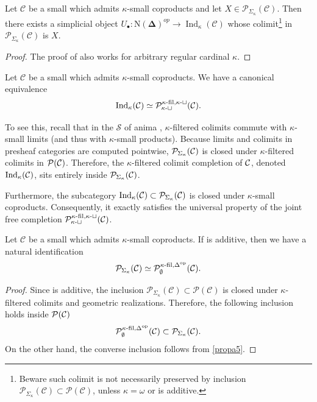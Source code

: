 \documentclass[a4paper,10pt, oneside]{amsart}
\begin{document}
\begin{prop}\label{propa5}
	Let $\mathcal{C}$ be a small \infcat which admits $\kappa$-small coproducts and let $X \in \mathcal{P}_{\Sigma_\kappa}(\mathcal{C})$. Then there exists a simplicial object $U_{\bullet}: \mathrm{N}(\boldsymbol{\Delta})^{o p} \rightarrow \operatorname{Ind}_\kappa(\mathcal{C})$ whose colimit\footnote{Beware such colimit is not necessarily preserved by inclusion $\mathcal{P}_{\Sigma_\kappa}(\mathcal{C}) \subset \mathcal{P}(\mathcal{C})$, unless $\kappa=\omega$ or \mcc is additive.} in $\mathcal{P}_{\Sigma_\kappa}(\mathcal{C})$ is $X$.
	
\end{prop}
\begin{proof}
	The proof of \cite[Lemma 5.5.8.14]{htt} also works for arbitrary regular cardinal $\kappa$.
\end{proof}
\begin{rem}
	Let $\mathcal{C}$ be a small \infcat which admits $\kappa$-small coproducts. We have a canonical equivalence $$\mathrm{Ind}_\kappa(\mathcal{C}) \simeq \mathcal{P}_{\kappa\text{-}\sqcup}^{\kappa\text{-}\mathrm{fil},\kappa\text{-}\sqcup}(\mathcal{C}).$$
	
	To see this, recall that
	in the \infcat $\mathcal{S}$ of anima , $\kappa$-filtered colimits commute with $\kappa$-small limits (and thus with $\kappa$-small products). Because limits and colimits in presheaf categories are computed pointwise, $\mathcal{P}_{\Sigma_\kappa}(\mathcal{C})$ is closed under $\kappa$-filtered colimits in $\mathcal{P}(\mathcal{C})$. Therefore, the $\kappa$-filtered colimit completion of $\mathcal{C}$, denoted $\mathrm{Ind}_\kappa(\mathcal{C})$, sits entirely inside $\mathcal{P}_{\Sigma_\kappa}(\mathcal{C})$.
	
	Furthermore, the subcategory $\mathrm{Ind}_\kappa(\mathcal{C}) \subset \mathcal{P}_{\Sigma_\kappa}(\mathcal{C})$ is  closed under $\kappa$-small coproducts. Consequently, it exactly satisfies the universal property of the joint free completion $\mathcal{P}_{\kappa\text{-}\sqcup}^{\kappa\text{-}\mathrm{fil},\kappa\text{-}\sqcup}(\mathcal{C})$.
\end{rem}
\begin{cor}
	Let $\mathcal{C}$ be a small \infcat which admits $\kappa$-small coproducts.
	If  \mcc is additive, then we have a natural identification  $$\mathcal{P}_{\Sigma_\kappa}(\mathcal{C})\simeq \mathcal{P}_{\emptyset}^{\kappa\text{-}\mathrm{fil},\Delta^{\mathrm{op}}}(\mathcal{C}).$$
\end{cor}
\begin{proof}
	Since \mcc is additive, the inclusion $\mathcal{P}_{\Sigma_\kappa}(\mathcal{C})\subset \mathcal{P}(\mathcal{C})$ is closed under $\kappa$-filtered colimits and geometric realizations. Therefore, the following inclusion holds inside $\mathcal{P}(\mathcal{C})$ $$\mathcal{P}_{\emptyset}^{\kappa\text{-}\mathrm{fil},\Delta^{\mathrm{op}}}(\mathcal{C})\subset\mathcal{P}_{\Sigma_\kappa}(\mathcal{C}).$$
	On the other hand, the converse inclusion follows from \cref{propa5}.
\end{proof}
\end{document}
